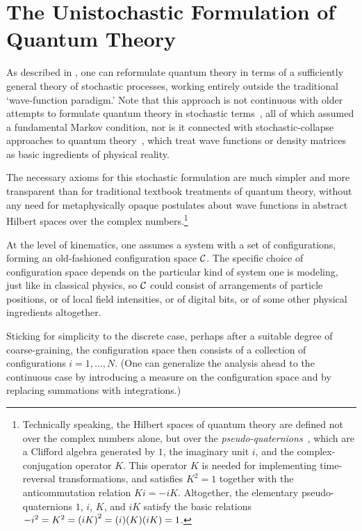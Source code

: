 \documentclass[12pt,english,prl,superscriptaddress,nobibnotes,nofootinbib]{revtex4-2}
\let\originalleft\left
\let\originalright\right
\renewcommand{\left}{\mathopen{}\mathclose\bgroup\originalleft}
\renewcommand{\right}{\aftergroup\egroup\originalright}
\begin{document}
\section{The Unistochastic Formulation of Quantum Theory\label{sec:The-Unistochastic-Formulation-of-Quantum-Theory}}

As described in \citep{Barandes:2023tsqc,Barandes:2023tsqt}, one
can reformulate quantum theory in terms of a sufficiently general
theory of stochastic processes, working entirely outside the traditional
\textquoteleft wave-function paradigm.\textquoteright{} Note that
this approach is not continuous with older attempts to formulate quantum
theory in stochastic terms~\citep{Bopp:1947qsuk,Bopp:1952efdqbsdk,Bopp:1953sudgdqde,Fenyes:1952ewbuidq,Nelson:1966dtobm,Nelson:1985qf},
all of which assumed a fundamental Markov condition, nor is it connected
with stochastic-collapse approaches to quantum theory~\citep{GhirardiRiminiWeber:1986udmms},
which treat wave functions or density matrices as basic ingredients
of physical reality.

The necessary axioms for this stochastic formulation are much simpler
and more transparent than for traditional textbook treatments of quantum
theory, without any need for metaphysically opaque postulates about
wave functions in abstract Hilbert spaces over the complex numbers.\footnote{Technically speaking, the Hilbert spaces of quantum theory are defined
not over the complex numbers alone, but over the \emph{pseudo-quaternions}~\citep{Stueckelberg:1960qtirhs},
which are a Clifford algebra generated by $1$, the imaginary unit
$i$, and the complex-conjugation operator $K$. This operator $K$
is needed for implementing time-reversal transformations, and satisfies
$K^{2}=1$ together with the anticommutation relation $Ki=-iK$. Altogether,
the elementary pseudo-quaternions $1$, $i$, $K$, and $iK$ satisfy
the basic relations $-i^{2}=K^{2}=\left(iK\right)^{2}=\left(i\right)\left(K\right)\left(iK\right)=1$.}

At the level of kinematics, one assumes a system with a set of configurations,
forming an old-fashioned configuration space $\mathcal{C}$. The
specific choice of configuration space depends on the particular kind
of system one is modeling, just like in classical physics, so $\mathcal{C}$
could consist of arrangements of particle positions, or of local field
intensities, or of digital bits, or of some other physical ingredients
altogether. 

Sticking for simplicity to the discrete case, perhaps after a suitable
degree of coarse-graining, the configuration space then consists of
a collection of configurations $i=1,\dots,N$. (One can generalize
the analysis ahead to the continuous case by introducing a measure
on the configuration space and by replacing summations with integrations.)
\end{document}
